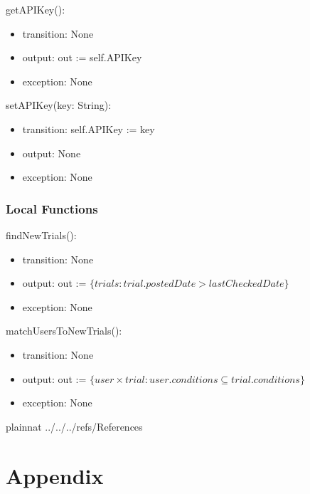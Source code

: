 \documentclass[12pt, titlepage]{article}
\begin{document}
\noindent getAPIKey():
\begin{itemize}
\item transition: None
\item output: out := self.APIKey
\item exception: None
\end{itemize}

\noindent setAPIKey(key: String):
\begin{itemize}
\item transition: self.APIKey := key
\item output: None
\item exception: None
\end{itemize}


\subsubsection{Local Functions}
\noindent findNewTrials():
\begin{itemize}
\item transition: None
\item output: out := $\{trials : trial.postedDate > lastCheckedDate\}$
\item exception: None
\end{itemize}

\noindent matchUsersToNewTrials():
\begin{itemize}
\item transition: None
\item output: out := $\{user \times trial : user.conditions \subseteq trial.conditions\}$
\item exception: None
\end{itemize}



\newpage

 {plainnat}
 {../../../refs/References}

\newpage

\section{Appendix} \label{Appendix}

\end{document}
